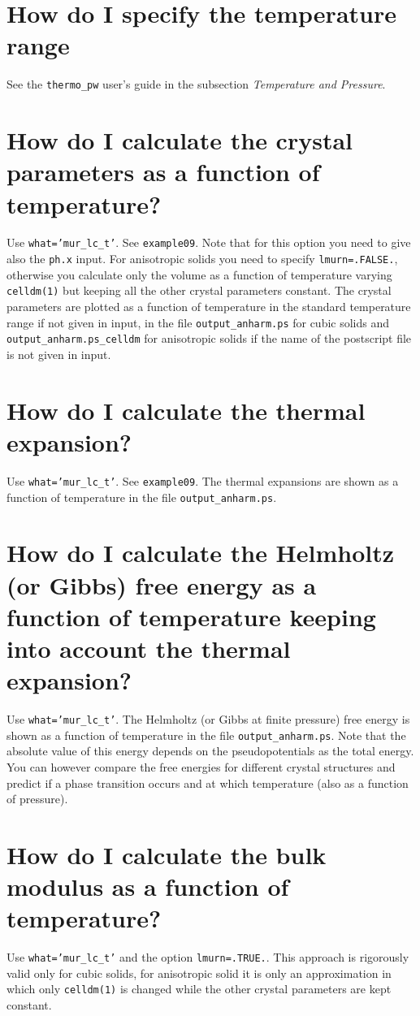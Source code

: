\documentclass[12pt,a4paper]{article}
\begin{document}
\newpage
\section{\color{coral}How do I specify the temperature range} 
See the \texttt{thermo\_pw} user's guide in the subsection 
{\it Temperature and Pressure}.

\newpage
\section{\color{coral}How do I calculate the crystal parameters as a function
of temperature?}
Use \texttt{what='mur\_lc\_t'}. See \texttt{example09}. Note that
for this option you need to give also the \texttt{ph.x} input.
For anisotropic solids you need to specify \texttt{lmurn=.FALSE.},
otherwise you calculate only the volume as a function of temperature
varying \texttt{celldm(1)} but keeping all the other crystal parameters
constant. The crystal parameters are plotted as a function of temperature
in the standard temperature range if not given in input, in the file 
\texttt{output\_anharm.ps} for cubic solids and
\texttt{output\_anharm.ps\_celldm} for anisotropic
solids if the name of the postscript file is not given in input.

\newpage
\section{\color{coral}How do I calculate the thermal expansion?}
Use \texttt{what='mur\_lc\_t'}. See \texttt{example09}. The thermal expansions
are shown as a function of temperature in the file \texttt{output\_anharm.ps}.

\newpage
\section{\color{coral}How do I calculate the Helmholtz (or Gibbs) free energy
as a function of temperature keeping into account the thermal expansion?}
Use \texttt{what='mur\_lc\_t'}. The Helmholtz (or Gibbs at finite pressure) 
free energy is shown as a function of temperature in the file 
\texttt{output\_anharm.ps}. Note that the absolute value of this energy
depends on the pseudopotentials as the total energy. You can however
compare the free energies for different crystal structures 
and predict if a phase transition occurs and at which temperature (also 
as a function of pressure).

\newpage
\section{\color{coral}How do I calculate the bulk modulus as a function of 
temperature?}
Use \texttt{what='mur\_lc\_t'} and the option \texttt{lmurn=.TRUE.}.
This approach is rigorously valid only for cubic solids, for anisotropic
solid it is only an approximation in which only \texttt{celldm(1)} is
changed while the other crystal parameters are kept constant.
\end{document}
